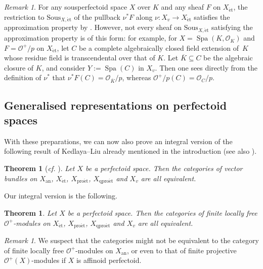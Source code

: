\documentclass[11pt]{amsart}
\numberwithin{equation}{section}
\newtheorem{Theorem}[thm]{Theorem}
\theoremstyle{definition}
\theoremstyle{remark}
\newtheorem{Remark}[thm]{Remark}
\renewcommand{\O}{\mathcal{O}}
\newcommand{\Spa}{\operatorname{Spa}}
\newcommand{\an}{{\mathrm{an}}}
\newcommand{\et}{{\operatorname{\acute{e}t}}}
\newcommand{\proet}{{\operatorname{pro\acute{e}t}}}
\newcommand{\qproet}{{\operatorname{qpro\acute{e}t}}}
\newcommand{\Sous}{\mathrm{Sous}}
\begin{document}
\begin{Remark}
	For any sousperfectoid space $X$ over $K$ and any sheaf $F$ on $X_\et$, the restriction to $\Sous_{X,\et}$ of the pullback $\nu^{\ast}F$ along $\nu\colon X_v\to X_{\et}$ satisfies the approximation property by \cite[Proposition 14.9]{etale-cohomology-of-diamonds}. However, not every sheaf on $\Sous_{X,\et}$  satisfying the approximation property is of this form: for example, for $X=\Spa(K,\O_K)$ and $F=\O^+/p$ on $X_\et$, let $C$ be a complete algebraically closed field extension of~$K$ whose residue field is transcendental over that of $K$. Let $\overline{K}\subseteq C$ be the algebraic closure of $K$, and consider $Y:=\Spa(C)$ in $X_v$. Then one sees directly from the definition of $\nu^\ast$ that $\nu^\ast F(C)=\O_{\overline{K}}/p$, whereas $\O^+/p(C)=\O_C/p$.
\end{Remark}

\subsection{Generalised representations on perfectoid spaces}



With these preparations, we can now also prove an integral version of the following result of Kedlaya--Liu  already mentioned in the introduction (see also \cite[Lemma~17.1.8]{ScholzeBerkeleyLectureNotes}). 

\begin{Theorem}[\textit{cf.} {\cite[Theorem 3.5.8]{KedlayaLiu-II}}]\label{t:loc-free-O-modules}
	Let $X$ be a perfectoid space. Then the categories of vector bundles on $X_{\an}$, $X_{\et}$,  $X_{\proet}$,  $X_{\qproet}$ and $X_{v}$ are all equivalent.
\end{Theorem}

Our integral version is the following. 

\begin{Theorem}\label{t:loc-free-O^+-modules}
	Let $X$ be a perfectoid space. Then the categories of finite locally free $\O^+$-modules on $X_{\et}$,  $X_{\proet}$,  $X_{\qproet}$ and $X_{v}$ are all equivalent.
\end{Theorem}

\begin{Remark}
	We suspect that the categories might not be equivalent to the category of finite locally free $\O^+$-modules on $X_{\an}$, or even to that of finite projective $\O^+(X)$-modules if $X$ is affinoid perfectoid.
\end{Remark}
\end{document}
